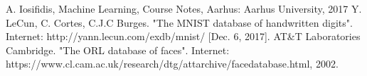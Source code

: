 \begin{thebibliography}{00}
  A. Iosifidis,  Machine Learning, Course Notes, Aarhus: Aarhus University, 2017
  Y. LeCun, C. Cortes, C.J.C Burges. "The MNIST database of handwritten digits". Internet: http://yann.lecun.com/exdb/mnist/ [Dec. 6, 2017]. 
 AT\&T Laboratories Cambridge. "The ORL database of faces". Internet: https://www.cl.cam.ac.uk/research/dtg/attarchive/facedatabase.html, 2002. 

\end{thebibliography}


